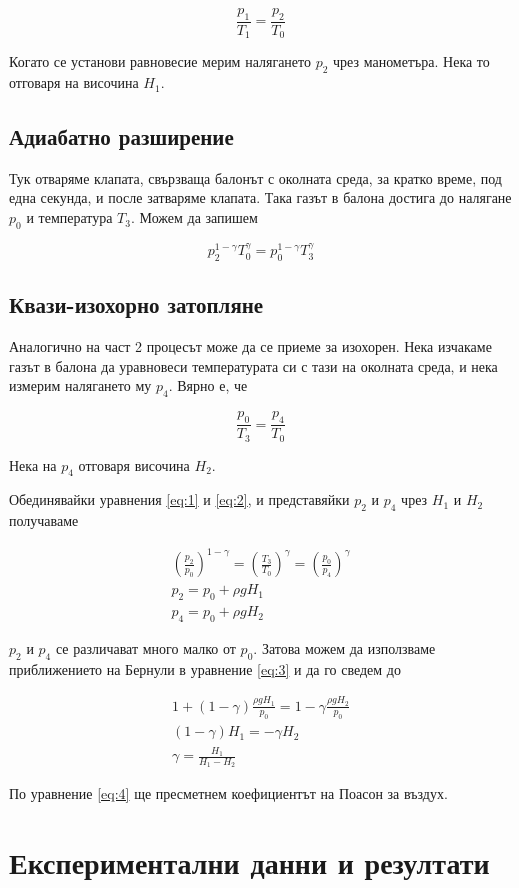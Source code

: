 \documentclass[%
 reprint,
 amsmath,amssymb,
 aps,
]{revtex4-2}
\begin{document}
\begin{equation*}
    \frac{p_1}{T_1} = \frac{p_2}{T_0}
\end{equation*}

Когато се установи равновесие мерим налягането $p_2$ чрез манометъра. Нека то отговаря на височина $H_1$. 

\subsection{Адиабатно разширение}
Тук отваряме клапата, свързваща балонът с околната среда, за кратко време, под една секунда, и после затваряме клапата. Така газът в балона достига до налягане $p_0$ и температура $T_3$. Можем да запишем

\begin{equation*}
    p_2^{1-\gamma} T_0^{\gamma} = p_0^{1 - \gamma} T_3^{\gamma} \label{eq:1} \tag{1}
\end{equation*}

\subsection{Квази-изохорно затопляне}
Аналогично на част 2 процесът може да се приеме за изохорен. Нека изчакаме газът в балона да уравновеси температурата си с тази на околната среда, и нека измерим налягането му $p_4$. Вярно е, че

\begin{equation*}
    \frac{p_0}{T_3} = \frac{p_4}{T_0} \label{eq:2} \tag{2}
\end{equation*}

Нека на $p_4$ отговаря височина $H_2$. 

Обединявайки уравнения \eqref{eq:1} и \eqref{eq:2}, и представяйки $p_2$ и $p_4$ чрез $H_1$ и $H_2$ получаваме

\begin{gather*}
    (\frac{p_2}{p_0})^{1 - \gamma} = (\frac{T_3}{T_0})^{\gamma} = (\frac{p_0}{p_4})^{\gamma} \label{eq:3} \tag{3}\\
    p_2 = p_0 + \rho g H_1 \\
    p_4 = p_0 + \rho g H_2
\end{gather*}

$p_2$ и $p_4$ се различават много малко от $p_0$. Затова можем да използваме приближението на Бернули в уравнение \eqref{eq:3} и да го сведем до 

\begin{gather*}
    1 + (1 - \gamma) \frac{\rho g H_1}{p_0} = 1 - \gamma \frac{\rho g H_2}{p_0} \\
    (1 - \gamma) H_1 = -\gamma H_2 \\
    \gamma = \frac{H_1}{H_1 - H_2} \label{eq:4} \tag{4}
\end{gather*}

По уравнение \eqref{eq:4} ще пресметнем коефициентът на Поасон за въздух. 
\section{Експериментални данни и резултати}
\end{document}

